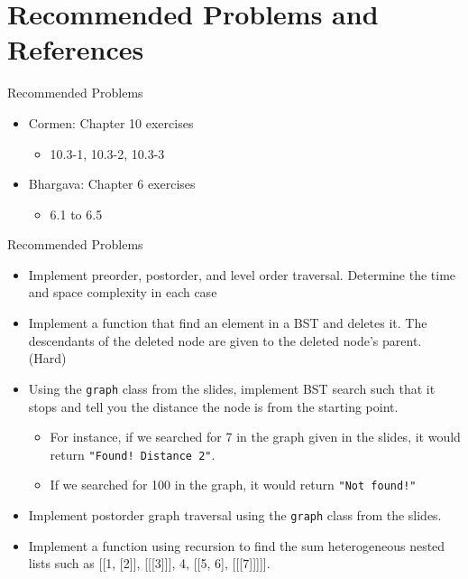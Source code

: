 \documentclass[
  ignorenonframetext,
]{beamer}
\providecommand{\tightlist}{%
  \setlength{\itemsep}{0pt}\setlength{\parskip}{0pt}}\usepackage{longtable,booktabs,array}
\begin{document}
\hypertarget{recommended-problems-and-references}{%
\section{Recommended Problems and
References}\label{recommended-problems-and-references}}

\begin{frame}{Recommended Problems}
\protect\hypertarget{recommended-problems}{}
\begin{itemize}
\item
  Cormen: Chapter 10 exercises

  \begin{itemize}
  \tightlist
  \item
    10.3-1, 10.3-2, 10.3-3
  \end{itemize}
\item
  Bhargava: Chapter 6 exercises

  \begin{itemize}
  \tightlist
  \item
    6.1 to 6.5
  \end{itemize}
\end{itemize}
\end{frame}

\begin{frame}[fragile]{Recommended Problems}
\protect\hypertarget{recommended-problems-1}{}
\begin{itemize}
\item
  Implement preorder, postorder, and level order traversal. Determine
  the time and space complexity in each case
\item
  Implement a function that find an element in a BST and deletes it. The
  descendants of the deleted node are given to the deleted node's
  parent. (Hard)
\item
  Using the \texttt{graph} class from the slides, implement BST search
  such that it stops and tell you the distance the node is from the
  starting point.

  \begin{itemize}
  \item
    For instance, if we searched for 7 in the graph given in the slides,
    it would return \texttt{"Found!\ Distance\ 2"}.
  \item
    If we searched for 100 in the graph, it would return
    \texttt{"Not\ found!"}
  \end{itemize}
\item
  Implement postorder graph traversal using the \texttt{graph} class
  from the slides.
\item
  Implement a function using recursion to find the sum heterogeneous
  nested lists such as {[}{[}1, {[}2{]}{]}, {[}{[}{[}3{]}{]}{]}, 4,
  {[}{[}5, 6{]}, {[}{[}{[}7{]}{]}{]}{]}{]}.
\end{itemize}
\end{frame}
\end{document}
